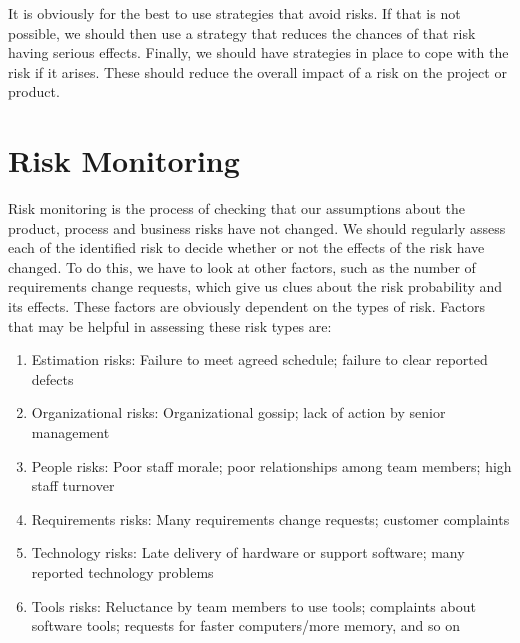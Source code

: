 It is obviously for the best to use strategies that avoid risks. If that is not possible, we should then use a strategy that reduces the chances of that risk having serious effects. Finally, we should have strategies in place to cope with the risk if it arises. These should reduce the overall impact of a risk on the project or product.

\section{Risk Monitoring}
Risk monitoring is the process of checking that our assumptions about the product, process and business risks have not changed. We should regularly assess each of the identified risk to decide whether or not the effects of the risk have changed. To do this, we have to look at other factors, such as the number of requirements change requests, which give us clues about the risk probability and its effects. These factors are obviously dependent on the types of risk. Factors that may be helpful in assessing these risk types are:
\begin{enumerate}
    \item Estimation risks: Failure to meet agreed schedule; failure to clear reported defects
    \item Organizational risks: Organizational gossip; lack of action by senior management
    \item People risks: Poor staff morale; poor relationships among team members; high staff turnover
    \item Requirements risks: Many requirements change requests; customer complaints
    \item Technology risks: Late delivery of hardware or support software; many reported technology problems
    \item Tools risks: Reluctance by team members to use tools; complaints about software tools; requests for faster computers/more memory, and so on
\end{enumerate}
